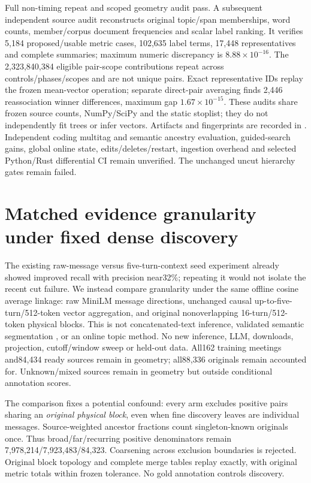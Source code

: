 \documentclass[11pt]{article}
\begin{document}
Full non-timing repeat and scoped geometry audit pass. A subsequent independent
source audit reconstructs original topic/span memberships, word counts,
member/corpus document frequencies and scalar label ranking. It verifies
5,184 proposed/usable metric cases, 102,635 label terms, 17,448 representatives
and complete summaries; maximum numeric discrepancy is
$8.88\times10^{-16}$. The 2,323,840,384 eligible pair-scope contributions repeat
across controls/phases/scopes and are not unique pairs. Exact representative
IDs replay the frozen mean-vector operation; separate direct-pair averaging
finds 2,446 reassociation winner differences, maximum gap
$1.67\times10^{-15}$. These audits share frozen source counts, NumPy/SciPy
and the static stoplist; they do not independently fit trees or infer vectors.
Artifacts and fingerprints are recorded in
. Independent coding multitag
and semantic ancestry evaluation, guided-search gains, global online state,
edits/deletes/restart, ingestion overhead and selected Python/Rust differential
CI remain unverified. The unchanged uncut hierarchy gates remain failed.

\section{Matched evidence granularity under fixed dense discovery}
The existing raw-message versus five-turn-context seed experiment already
showed improved recall with precision near32\%; repeating it would not isolate
the recent cut failure. We instead compare granularity under the same offline
cosine average linkage: raw MiniLM message directions, unchanged causal
up-to-five-turn/512-token vector aggregation, and original nonoverlapping
16-turn/512-token physical blocks. This is not concatenated-text inference,
validated semantic segmentation \cite{texttiling}, or an online topic method.
No new inference, LLM, downloads, projection, cutoff/window sweep or held-out
data. All162 training meetings and84,434 ready sources remain in geometry;
all88,336 originals remain accounted for. Unknown/mixed sources remain in
geometry but outside conditional annotation scores.

The comparison fixes a potential confound: every arm excludes positive pairs
sharing an \emph{original physical block}, even when fine discovery leaves are
individual messages. Source-weighted ancestor fractions count singleton-known
originals once. Thus broad/far/recurring positive denominators remain
7,978,214/7,923,483/84,323. Coarsening across exclusion boundaries is rejected.
Original block topology and complete merge tables replay exactly, with original
metric totals within frozen tolerance. No gold annotation controls discovery.
\end{document}
